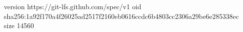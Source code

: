 version https://git-lfs.github.com/spec/v1
oid sha256:1a92f170a4f26025ad2517f2160eb0616ccdc6b4803cc2306a29be6e285338ec
size 14560
